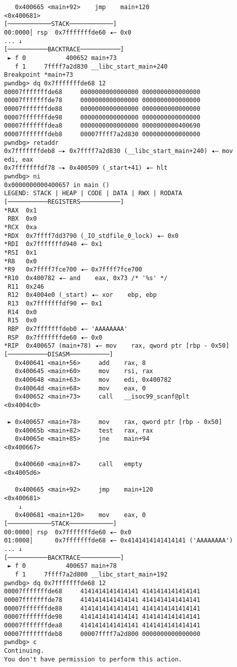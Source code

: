 \begin{lstlisting}
   0x400665 <main+92>    jmp    main+120                      <0x400681>
[────────────STACK────────────]
00:0000│ rsp  0x7fffffffde60 ◂— 0x0
... ↓
[───────────BACKTRACE───────────]
 ► f 0           400652 main+73
   f 1     7ffff7a2d830 __libc_start_main+240
Breakpoint *main+73
pwndbg> dq 0x7fffffffde68 12
00007fffffffde68     0000000000000000 0000000000000000
00007fffffffde78     0000000000000000 0000000000000000
00007fffffffde88     0000000000000000 0000000000000000
00007fffffffde98     0000000000000000 0000000000000000
00007fffffffdea8     0000000000000000 0000000000400690
00007fffffffdeb8     00007ffff7a2d830 0000000000000000
pwndbg> retaddr
0x7fffffffdeb8 —▸ 0x7ffff7a2d830 (__libc_start_main+240) ◂— mov    edi, eax
0x7fffffffdf78 —▸ 0x400509 (_start+41) ◂— hlt    
pwndbg> ni
0x0000000000400657 in main ()
LEGEND: STACK | HEAP | CODE | DATA | RWX | RODATA
[───────────REGISTERS───────────]
*RAX  0x1
 RBX  0x0
*RCX  0xa
*RDX  0x7ffff7dd3790 (_IO_stdfile_0_lock) ◂— 0x0
*RDI  0x7fffffffd940 ◂— 0x1
*RSI  0x1
*R8   0x0
*R9   0x7ffff7fce700 ◂— 0x7ffff7fce700
*R10  0x400782 ◂— and    eax, 0x73 /* '%s' */
 R11  0x246
 R12  0x4004e0 (_start) ◂— xor    ebp, ebp
 R13  0x7fffffffdf90 ◂— 0x1
 R14  0x0
 R15  0x0
 RBP  0x7fffffffdeb0 ◂— 'AAAAAAAA'
 RSP  0x7fffffffde60 ◂— 0x0
*RIP  0x400657 (main+78) ◂— mov    rax, qword ptr [rbp - 0x50]
[───────────DISASM───────────]
   0x400641 <main+56>     add    rax, 8
   0x400645 <main+60>     mov    rsi, rax
   0x400648 <main+63>     mov    edi, 0x400782
   0x40064d <main+68>     mov    eax, 0
   0x400652 <main+73>     call   __isoc99_scanf@plt            <0x4004c0>
 
 ► 0x400657 <main+78>     mov    rax, qword ptr [rbp - 0x50]
   0x40065b <main+82>     test   rax, rax
   0x40065e <main+85>     jne    main+94                       <0x400667>
 
   0x400660 <main+87>     call   empty                         <0x4005d6>
 
   0x400665 <main+92>     jmp    main+120                      <0x400681>
    ↓
   0x400681 <main+120>    mov    eax, 0
[────────────STACK────────────]
00:0000│ rsp  0x7fffffffde60 ◂— 0x0
01:0008│      0x7fffffffde68 ◂— 0x4141414141414141 ('AAAAAAAA')
... ↓
[───────────BACKTRACE───────────]
 ► f 0           400657 main+78
   f 1     7ffff7a2d800 __libc_start_main+192
pwndbg> dq 0x7fffffffde68 12
00007fffffffde68     4141414141414141 4141414141414141
00007fffffffde78     4141414141414141 4141414141414141
00007fffffffde88     4141414141414141 4141414141414141
00007fffffffde98     4141414141414141 4141414141414141
00007fffffffdea8     4141414141414141 4141414141414141
00007fffffffdeb8     00007ffff7a2d800 0000000000000000
pwndbg> c
Continuing.
You don't have permission to perform this action.


\end{lstlisting}
